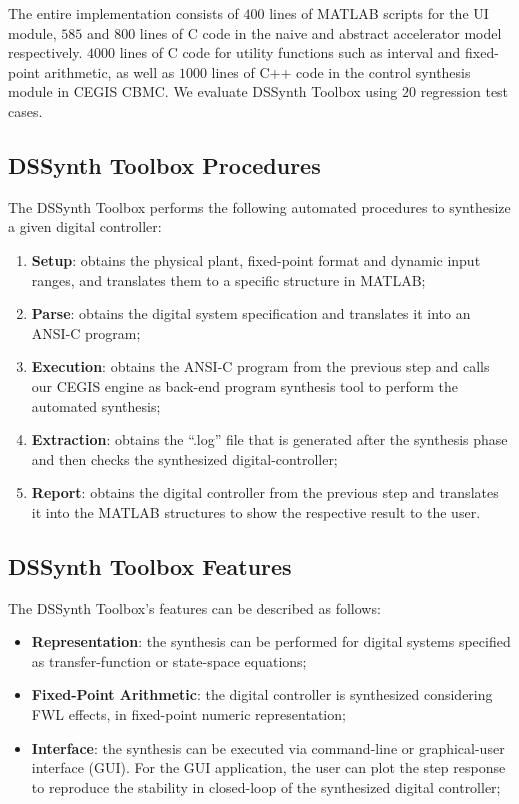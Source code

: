 \documentclass[10pt,conference]{IEEEtran}
\newcommand\tool{{DSSynth Toolbox}\xspace}
\begin{document}
The entire implementation consists of $400$ lines of MATLAB scripts for the UI
module, $585$ and $800$ lines of C code in the naive and abstract accelerator
model respectively.  $4000$ lines of C code for utility functions such as
interval and fixed-point arithmetic, as well as $1000$ lines of C++ code in the
control synthesis module in CEGIS CBMC.  We evaluate \tool using $20$ regression
test cases.

\subsection{\tool Procedures}

The \tool performs the following automated procedures 
to synthesize a given digital controller:

\begin{enumerate}
\item \textbf{Setup}: obtains the physical plant, fixed-point format 
and dynamic input ranges, and translates them to a specific structure in MATLAB;
\item \textbf{Parse}: obtains the digital system specification and translates 
it into an ANSI-C program;
\item \textbf{Execution}: obtains the ANSI-C program from the previous step 
and calls our CEGIS engine as back-end program synthesis tool to perform the automated synthesis;
\item \textbf{Extraction}: obtains the ``.log'' file that is generated 
after the synthesis phase and then checks the synthesized digital-controller;
\item \textbf{Report}: obtains the digital controller from the previous step 
and translates it into the MATLAB structures to show the respective result to the user.
\end{enumerate}

\subsection{\tool Features}

The \tool's features can be described as follows:

\begin{itemize}
\item \textbf{Representation}: the synthesis can be 
performed for digital systems specified as 
transfer-function or state-space equations;
\item \textbf{Fixed-Point Arithmetic}: the digital 
controller is synthesized considering FWL effects, 
in fixed-point numeric representation;
\item \textbf{Interface}: the synthesis can be executed 
via command-line or graphical-user interface (GUI). 
For the GUI application, the user can plot the step response 
to reproduce the stability in closed-loop of the synthesized digital controller;
\end{itemize}
\end{document}
